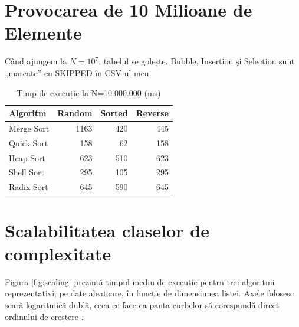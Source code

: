 \documentclass[12pt, a4paper]{article}
\begin{document}
\section{Provocarea de 10 Milioane de Elemente}
Când ajungem la $N=10^7$, tabelul se golește. Bubble, Insertion și Selection sunt „marcate” cu SKIPPED în CSV-ul meu.

\begin{table}[H]
\centering
\caption{Timp de execuție la N=10.000.000 (ms)}
\begin{tabular}{lrrr}
\toprule
\textbf{Algoritm} & \textbf{Random} & \textbf{Sorted} & \textbf{Reverse} \\
\midrule
Merge Sort & 1163 & 420 & 445 \\
Quick Sort & 158 & 62 & 158 \\
Heap Sort & 623 & 510 & 623 \\
Shell Sort & 295 & 105 & 295 \\
Radix Sort & 645 & 590 & 645 \\
\bottomrule
\end{tabular}
\end{table}
\section{Scalabilitatea claselor de complexitate}
Figura \ref{fig:scaling} prezintă timpul mediu de execuție pentru trei
algoritmi reprezentativi, pe date aleatoare, în funcție de dimensiunea
listei. Axele folosesc scară logaritmică dublă, ceea ce face ca panta
curbelor să corespundă direct ordinului de creștere
\citep{sedgewick2011}.
\end{document}
